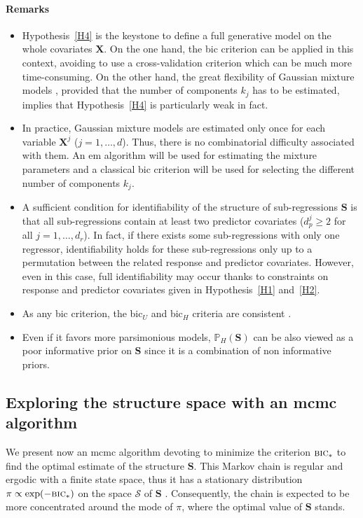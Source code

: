 \documentclass[11pt,a4paper]{article}
\begin{document}
\paragraph{Remarks}
\begin{itemize}
\item Hypothesis~\ref{H4} is the keystone to define a full generative model on the whole covariates $\boldsymbol{X}$. On the one hand, the {\sc bic} criterion can be applied in this context, avoiding to use a cross-validation criterion which can be much more time-consuming. On the other hand, the great flexibility  of Gaussian mixture models \cite{mclachlan2004finite}, provided that the number of components $k_j$ has to be estimated, implies that Hypothesis~\ref{H4} is particularly weak in fact.
\item In practice, Gaussian mixture models are estimated only once for each variable $\boldsymbol{X}^j$ ($j=1,\ldots,d$). Thus, there is no combinatorial difficulty associated with them. An {\sc em} algorithm \cite{dempster1977maximum} will be used for estimating the mixture parameters and a classical {\sc bic} criterion \cite{Sch1978} will be used for selecting the different number of components $k_j$.
\item A sufficient condition for identifiability of the structure of sub-regressions $\boldsymbol{S}$ is that all sub-regressions contain at least two predictor covariates ($d_p^j\geq 2$ for all $j=1,\ldots,d_r$). In fact, if there exists some sub-regressions with only one regressor, identifiability holds for these sub-regressions only up to a permutation between the related response and predictor covariates. However, even in this case, full identifiability may occur thanks to constraints on response and predictor covariates given in Hypothesis~\ref{H1} and~\ref{H2}.
\item As any {\sc bic} criterion, the {\sc bic}$_U$ and {\sc bic}$_H$ criteria are consistent \cite{BIChuard}.
\item Even if it favors more parsimonious models, $\mathbb{P}_H(\boldsymbol{S})$ can be also viewed as a poor informative prior on $\boldsymbol{S}$ since it is a combination of non informative priors.
\end{itemize}


\subsection{Exploring the structure space with an {\sc mcmc} algorithm}
We present now an {\sc mcmc} algorithm devoting to minimize the criterion $\mbox{{\sc bic}}_*$ to find the optimal estimate of the structure $\boldsymbol{S}$. This Markov chain is regular and ergodic with a finite state space, thus it has a stationary distribution $\pi\propto\exp(-\mbox{{\sc bic}}_*)$ on the space $\mathcal{S}$ of $\boldsymbol{S}$ \cite{grinstead1997introduction}. Consequently, the chain is expected to be more concentrated around the mode of $\pi$, where the optimal value of $\boldsymbol{S}$ stands.
\end{document}
